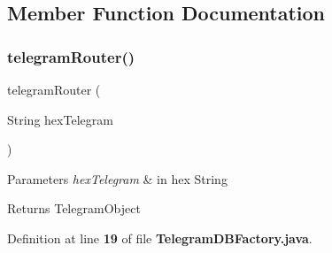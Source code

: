 \subsection{Member Function Documentation}
\label{classch_1_1bfh_1_1gr33nopo55um_1_1enocean_1_1persistence_1_1TelegramDBFactory_aa3e18eb7573a67ca3d664e5fc2ae1529} 
\subsubsection{telegram\+Router()}
{\footnotesize{} telegram\+Router (\begin{DoxyParamCaption}\item[{String}]{hex\+Telegram }\end{DoxyParamCaption})}


\begin{DoxyParams}{Parameters}
{\em hex\+Telegram} & in hex String \\
\hline
\end{DoxyParams}
\begin{DoxyReturn}{Returns}
Telegram\+Object 
\end{DoxyReturn}


Definition at line {\bf 19} of file {\bf Telegram\+D\+B\+Factory.\+java}.

